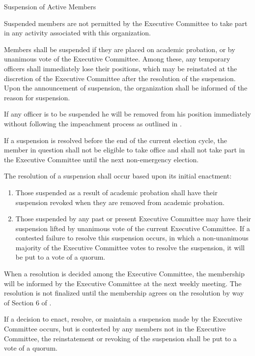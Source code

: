 {
	\begin{article}{Suspension of Active Members}
		\item Suspended members are not permitted by the Executive Committee to take part in any activity associated with this organization.
		\item Members shall be suspended if they are placed on academic probation, or by unanimous vote of the Executive Committee.  Among these, any temporary officers shall immediately lose their positions, which may be reinstated at the discretion of the Executive Committee after the resolution of the suspension.  Upon the announcement of suspension, the organization shall be informed of the reason for suspension.
		\item If any officer is to be suspended he will be removed from his position immediately without following the impeachment process as outlined in .
		\item If a suspension is resolved before the end of the current election cycle, the member in question shall not be eligible to take office and shall not take part in the Executive Committee until the next non-emergency election.
		\item The resolution of a suspension shall occur based upon its initial enactment:
		\begin{enumerate}
			\item Those suspended as a result of academic probation shall have their suspension revoked when they are removed from academic probation.
			\item Those suspended by any past or present Executive Committee may have their suspension lifted by unanimous vote of the current Executive Committee.  If a contested failure to resolve this suspension occurs, in which a non-unanimous majority of the Executive Committee votes to resolve the suspension, it will be put to a vote of a quorum.
		\end{enumerate}
	When a resolution is decided among the Executive Committee, the membership will be informed by the Executive Committee at the next weekly meeting.  The resolution is not finalized until the membership agrees on the resolution by way of Section 6 of .
	\item If a decision to enact, resolve, or maintain a suspension made by the Executive Committee occurs, but is contested by any members not in the Executive Committee, the reinstatement or revoking of the suspension shall be put to a vote of a quorum.
	\end{article}
}